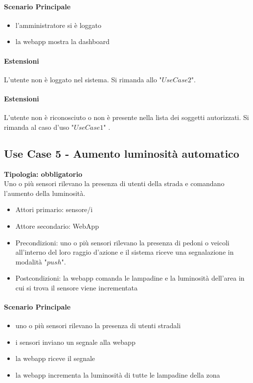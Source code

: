 \documentclass[12pt]{article}
\begin{document}
\paragraph{Scenario Principale}
\begin{itemize}
	\item l'amministratore si è loggato
	\item la webapp mostra la dashboard
\end{itemize}

\paragraph{Estensioni} L'utente non è loggato nel sistema. Si rimanda allo "$Use Case 2$".
\paragraph{Estensioni} L'utente non è riconosciuto o non è presente nella lista dei soggetti autorizzati. Si rimanda al caso d'uso "$Use Case 1$" .

\subsection{Use Case 5 - Aumento luminosità automatico}
\textbf{Tipologia: obbligatorio}\\
Uno o più sensori rilevano la presenza di utenti della strada e comandano l'aumento della luminosità.
\begin{itemize}
	\item Attori primario: sensore/i
	\item Attore secondario: WebApp
	\item Precondizioni: uno o più sensori rilevano la presenza di pedoni o veicoli all'interno del loro raggio d'azione e il sistema riceve una segnalazione in modalità "$push$".
	\item Postcondizioni: la webapp comanda le lampadine e la luminosità dell'area in cui si trova il sensore viene incrementata
\end{itemize}
\paragraph{Scenario Principale}
\begin{itemize}
	\item uno o più sensori rilevano la presenza di utenti stradali
	\item i sensori inviano un segnale alla webapp
	\item la webapp riceve il segnale
	\item la webapp incrementa la luminosità di tutte le lampadine della zona
\end{itemize}
\end{document}
